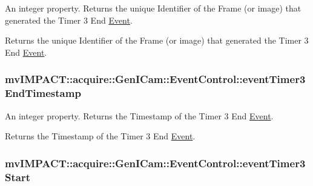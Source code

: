 An integer property. Returns the unique Identifier of the Frame (or image) that generated the Timer 3 End \hyperlink{classmv_i_m_p_a_c_t_1_1acquire_1_1_event}{Event}. 

Returns the unique Identifier of the Frame (or image) that generated the Timer 3 End \hyperlink{classmv_i_m_p_a_c_t_1_1acquire_1_1_event}{Event}. \hypertarget{classmv_i_m_p_a_c_t_1_1acquire_1_1_gen_i_cam_1_1_event_control_ad4d6da22c32e8fb5750b8e252f793d83}{
\subsubsection[{event\+Timer3\+End\+Timestamp}]{ mv\+I\+M\+P\+A\+C\+T\+::acquire\+::\+Gen\+I\+Cam\+::\+Event\+Control\+::event\+Timer3\+End\+Timestamp}}\label{classmv_i_m_p_a_c_t_1_1acquire_1_1_gen_i_cam_1_1_event_control_ad4d6da22c32e8fb5750b8e252f793d83}


An integer property. Returns the Timestamp of the Timer 3 End \hyperlink{classmv_i_m_p_a_c_t_1_1acquire_1_1_event}{Event}. 

Returns the Timestamp of the Timer 3 End \hyperlink{classmv_i_m_p_a_c_t_1_1acquire_1_1_event}{Event}. \hypertarget{classmv_i_m_p_a_c_t_1_1acquire_1_1_gen_i_cam_1_1_event_control_a3b5d01a02daa681a65fead174b9c468a}{
\subsubsection[{event\+Timer3\+Start}]{ mv\+I\+M\+P\+A\+C\+T\+::acquire\+::\+Gen\+I\+Cam\+::\+Event\+Control\+::event\+Timer3\+Start}}\label{classmv_i_m_p_a_c_t_1_1acquire_1_1_gen_i_cam_1_1_event_control_a3b5d01a02daa681a65fead174b9c468a}


